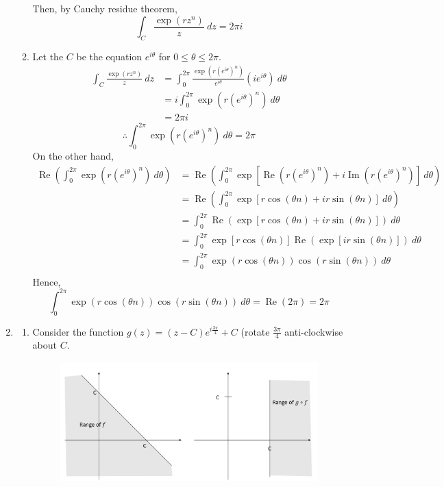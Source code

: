 \documentclass{article}
\newcommand{\paren}[1]{\left(#1\right)}
\DeclareMathOperator{\real}{Re}
\DeclareMathOperator{\imm}{Im}
\begin{document}
\begin{enumerate}
\begin{enumerate}
Then, by Cauchy residue theorem,
\[
\int_C \frac{\exp(rz^n)}{z}\ dz = 2\pi i
\]
\item Let the $C$ be the equation $e^{i\theta}$ for $0 \leq \theta \leq 2\pi$.
\begin{align*}
\int_C \frac{\exp(rz^n)}{z}\ dz &= \int_{0}^{2\pi} \frac{\exp(r(e^{i\theta})^n)}{e^{i\theta}} (ie^{i\theta})\ d\theta \\
    &= i \int_{0}^{2\pi} \exp(r(e^{i\theta})^n) \ d\theta \\
    &= 2\pi i
\end{align*}
\[
\therefore \int_{0}^{2\pi} \exp(r(e^{i\theta})^n) \ d\theta = 2\pi
\]
On the other hand,
\begin{align*}
\real \paren{\int_{0}^{2\pi} \exp(r(e^{i\theta})^n) \ d\theta} &= \real \paren{\int_{0}^{2\pi} \exp[\real(r(e^{i\theta})^n) + i\imm(r(e^{i\theta})^n)] \ d\theta} \\
    &= \real \paren{\int_{0}^{2\pi} \exp[r \cos(\theta n) + ir \sin(\theta n)] \ d\theta} \\
    &= \int_{0}^{2\pi} \real \paren{\exp[r \cos(\theta n) + ir \sin(\theta n)]} \ d\theta \\
    &= \int_{0}^{2\pi} \exp[r \cos(\theta n)] \real \paren{\exp[ir \sin(\theta n)]} \ d\theta \\
    &= \int_{0}^{2\pi} \exp(r \cos(\theta n)) \cos(r \sin(\theta n)) \ d\theta \\
\end{align*}
Hence,
\[\int_{0}^{2\pi} \exp(r \cos(\theta n)) \cos(r \sin(\theta n)) \ d\theta = \real(2\pi) = 2\pi\]
\end{enumerate}
\item
\begin{enumerate}
\item Consider the function $g(z) = (z - C)e^{i\frac{3\pi}{4}} + C$ (rotate $\frac{3\pi}{4}$ anti-clockwise about $C$.

\begin{figure}[h]
\centering
\includegraphics[scale=0.5]{Q6_diagram}
\end{figure}


\end{enumerate}
\end{enumerate}
\end{document}
